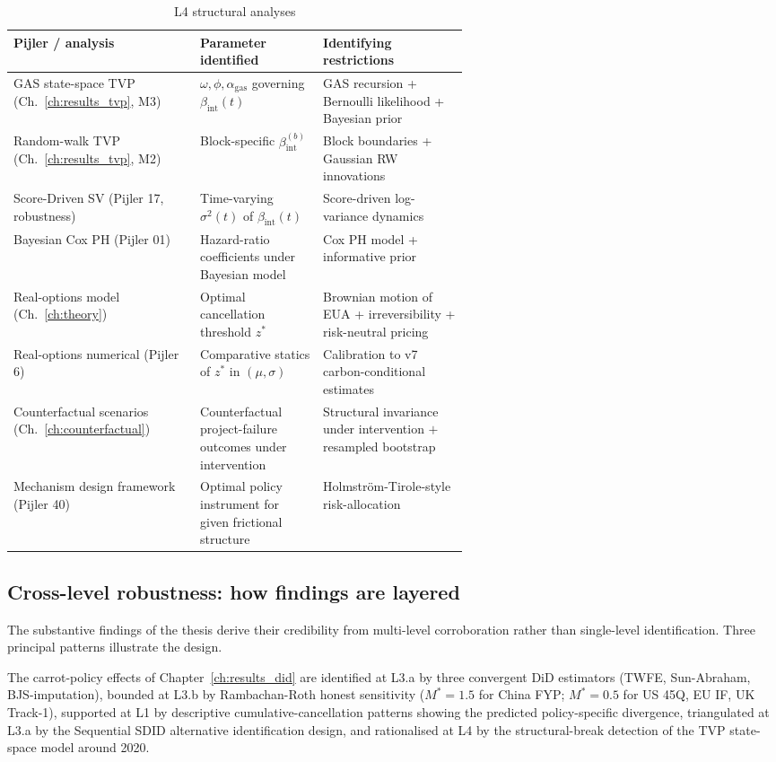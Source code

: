 \begin{table}[!htbp]
\centering
\caption{L4 structural analyses}
\label{tab:app-id-L4}
\small
\begin{tabular}{lp{0.27\linewidth}p{0.32\linewidth}}
\toprule
Pijler / analysis & Parameter identified & Identifying restrictions \\
\midrule
GAS state-space TVP (Ch.~\ref{ch:results_tvp}, M3) & $\omega, \phi, \alpha_{\mathrm{gas}}$ governing $\beta_{\mathrm{int}}(t)$ & GAS recursion + Bernoulli likelihood + Bayesian prior \\
Random-walk TVP (Ch.~\ref{ch:results_tvp}, M2) & Block-specific $\beta_{\mathrm{int}}^{(b)}$ & Block boundaries + Gaussian RW innovations \\
Score-Driven SV (Pijler 17, robustness) & Time-varying $\sigma^2(t)$ of $\beta_{\mathrm{int}}(t)$ & Score-driven log-variance dynamics \\
Bayesian Cox PH (Pijler 01) & Hazard-ratio coefficients under Bayesian model & Cox PH model + informative prior \\
Real-options model (Ch.~\ref{ch:theory}) & Optimal cancellation threshold $z^*$ & Brownian motion of EUA + irreversibility + risk-neutral pricing \\
Real-options numerical (Pijler 6) & Comparative statics of $z^*$ in $(\mu, \sigma)$ & Calibration to v7 carbon-conditional estimates \\
Counterfactual scenarios (Ch.~\ref{ch:counterfactual}) & Counterfactual project-failure outcomes under intervention & Structural invariance under intervention $+$ resampled bootstrap \\
Mechanism design framework (Pijler 40) & Optimal policy instrument for given frictional structure & Holmstr\"om-Tirole-style risk-allocation \\
\bottomrule
\end{tabular}
\end{table}

\subsection*{Cross-level robustness: how findings are layered}

The substantive findings of the thesis derive their credibility from multi-level corroboration rather than single-level identification. Three principal patterns illustrate the design.

The carrot-policy effects of Chapter~\ref{ch:results_did} are identified at L3.a by three convergent DiD estimators (TWFE, Sun-Abraham, BJS-imputation), bounded at L3.b by Rambachan-Roth honest sensitivity ($M^* = 1.5$ for China FYP; $M^* = 0.5$ for US 45Q, EU IF, UK Track-1), supported at L1 by descriptive cumulative-cancellation patterns showing the predicted policy-specific divergence, triangulated at L3.a by the Sequential SDID alternative identification design, and rationalised at L4 by the structural-break detection of the TVP state-space model around 2020.


